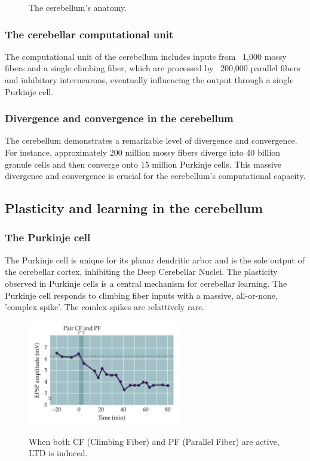 \documentclass[11pt]{book} %
\begin{document}
\begin{figure}[ht]
\begin{subfigure}[b]{0.5\textwidth}
        \label{fig:third_subfig}
    \end{subfigure}
    \label{fig:three_subfigures}
    \caption[short]{The cerebellum's anatomy.}
\end{figure}


\subsubsection{The cerebellar computational unit}
The computational unit of the cerebellum includes inputs from ~1,000 mossy fibers and a single climbing fiber, which are processed by ~200,000 parallel 
fibers and inhibitory interneurons, eventually influencing the output through a single Purkinje cell.

\subsubsection{Divergence and convergence in the cerebellum}
The cerebellum demonstrates a remarkable level of divergence and convergence. For instance, approximately 200 million mossy fibers diverge into 40 billion granule cells and then converge onto 15 million Purkinje cells. This massive divergence and convergence is crucial for the cerebellum's computational capacity.

\subsection{Plasticity and learning in the cerebellum}

\subsubsection{The Purkinje cell}
The Purkinje cell is unique for its planar dendritic arbor and is the sole output of the cerebellar cortex, inhibiting the Deep Cerebellar Nuclei. The plasticity observed in Purkinje cells is a central mechanism for cerebellar learning.
The Purkinje cell responds to climbing fiber inputs with a massive, all-or-none, 'complex spike'. The comlex spikes are relattively rare. 

\begin{figure}[ht]
\centering
\centering
\includegraphics[width=0.6\textwidth]{./Figs/CF_PF.jpeg}
\label{fig:CF_PF}
\caption{When both CF (Climbing Fiber) and PF (Parallel Fiber) are active, LTD is induced.}
\end{figure}
\end{document}
